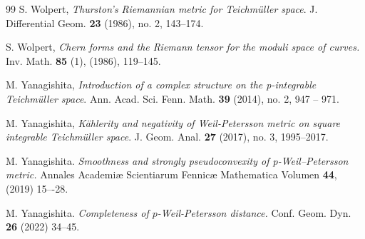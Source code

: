 \documentclass[12pt]{amsart}
\theoremstyle{plain}
\theoremstyle{definition}
\theoremstyle{remark}
\numberwithin{equation}{section} %
\numberwithin{figure}{section} %
\begin{document}
\begin{thebibliography}{99}
 S. Wolpert,
{\it Thurston's Riemannian metric for Teichm\"uller space}. 
J. Differential Geom. {\bf 23} (1986), no. 2, 143–174. 

 S. Wolpert, {\it Chern forms and the Riemann tensor for the moduli space of curves.} Inv. Math. {\bf 85}
(1),  (1986), 119--145.


 M. Yanagishita, {\it Introduction of a complex structure on the p-integrable Teichm\"uller space}.
  Ann. Acad. Sci. Fenn. Math. {\bf 39} (2014), no. 2, 947 -- 971.
  
  M. Yanagishita, {\it K\"ahlerity and negativity of Weil-Petersson metric on square integrable Teichm\"uller space}. J. Geom. Anal. \textbf{27} (2017), no. 3, 1995--2017.

 M. Yanagishita.  {\it Smoothness and strongly pseudoconvexity of p-Weil–Petersson metric.}
Annales Academiæ Scientiarum Fennicæ Mathematica Volumen {\bf 44}, (2019) 15–-28.

 M. Yanagishita. {\it Completeness of $p$-Weil-Petersson distance.}  Conf. Geom. Dyn. {\bf 26} (2022) 34--45.

\end{thebibliography}
\end{document}
